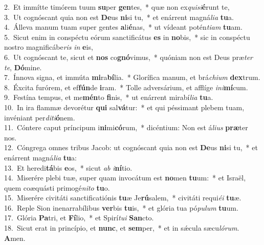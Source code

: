 {2.~}Et immítte timórem tuum \textbf{su}per \textbf{gen}tes,~* quæ non ex\textit{qui}\textit{si}\textbf{é}runt te,\\
{3.~}Ut cognóscant quia non est \textbf{De}us \textbf{ni}si tu,~* et enárrent magná\textit{li}\textit{a} \textbf{tu}a.\\
{4.~}Álleva manum tuam super gentes \textbf{a}li\textbf{é}nas,~* ut vídeant potén\textit{ti}\textit{am} \textbf{tu}am.\\
{5.~}Sicut enim in conspéctu eórum sanctificátus \textbf{es} in \textbf{no}bis,~* sic in conspéctu nostro magnificábe\textit{ris} \textit{in} \textbf{e}is,\\
{6.~}Ut cognóscant te, sicut et \textbf{nos} co\textbf{gnó}vimus,~* quóniam non est Deus præ\textit{ter} \textit{te}, \textbf{Dó}mine.\\
{7.~}Ínnova signa, et immúta \textbf{mi}ra\textbf{bí}lia.~* Glorífica manum, et brá\textit{chi}\textit{um} \textbf{dex}trum.\\
{8.~}Éxcita furórem, et ef\textbf{fún}de \textbf{i}ram.~* Tolle adversárium, et afflíge \textit{i}\textit{ni}\textbf{mí}cum.\\
{9.~}Festína tempus, et me\textbf{mén}to \textbf{fi}nis,~* ut enárrent mirabí\textit{li}\textit{a} \textbf{tu}a.\\
{10.~}In ira flammæ devorétur \textbf{qui} sal\textbf{vá}tur:~* et qui péssimant plebem tuam, invéniant per\textit{di}\textit{ti}\textbf{ó}nem.\\
{11.~}Cóntere caput príncipum i\textbf{ni}mi\textbf{có}rum,~* dicéntium: Non est á\textit{li}\textit{us} \textbf{præ}ter nos.\\
{12.~}Cóngrega omnes tribus Jacob: ut cognóscant quia non est \textbf{De}us \textbf{ni}si tu,~* et enárrent magná\textit{li}\textit{a} \textbf{tu}a:\\
{13.~}Et heredi\textbf{tá}bis \textbf{e}os,~* sicut \textit{ab} \textit{i}\textbf{ní}tio.\\
{14.~}Miserére plebi tuæ, super quam invocátum est \textbf{no}men \textbf{tu}um:~* et Israël, quem coæquásti primogé\textit{ni}\textit{to} \textbf{tu}o.\\
{15.~}Miserére civitáti sanctificatiónis \textbf{tu}æ Je\textbf{rú}salem,~* civitáti requi\textit{é}\textit{i} \textbf{tu}æ.\\
{16.~}Reple Sion inenarrabílibus \textbf{ver}bis \textbf{tu}is,~* et glória tua pó\textit{pu}\textit{lum} \textbf{tu}um.\\
{17.~}Glória \textbf{Pa}tri, et \textbf{Fí}lio,~* et Spirí\textit{tu}\textit{i} \textbf{San}cto.\\
{18.~}Sicut erat in princípio, et \textbf{nunc}, et \textbf{sem}per,~* et in sǽcula sæcu\textit{ló}\textit{rum}. \textbf{A}men.\\
